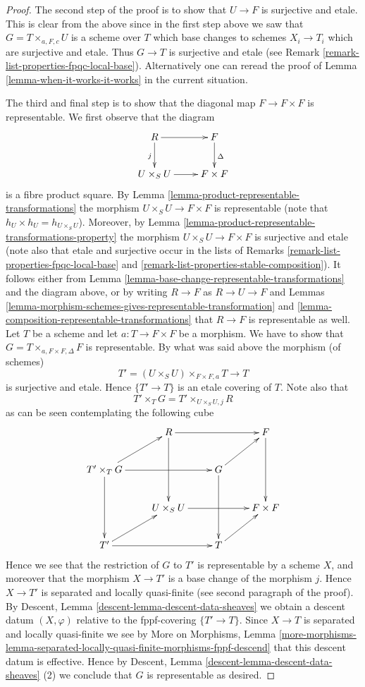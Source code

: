 \begin{proof}
\medskip\noindent
The second step of the proof is to show that $U \to F$ is surjective and
etale. This is clear from the above since in the first step above we
saw that $G = T \times_{a, F, c} U$ is a scheme over $T$ which base changes
to schemes $X_i \to T_i$ which are surjective and etale. Thus $G \to T$
is surjective and etale (see
Remark \ref{remark-list-properties-fpqc-local-base}).
Alternatively one can reread the proof of
Lemma \ref{lemma-when-it-works-it-works} in the current
situation.

\medskip\noindent
The third and final step is to show that the diagonal map $F \to F \times F$
is representable. We first observe that the diagram
$$
\xymatrix{
R \ar[r] \ar[d]_j & F \ar[d]^\Delta \\
U \times_S U \ar[r] & F \times F
}
$$
is a fibre product square. By
Lemma \ref{lemma-product-representable-transformations} the morphism
$U \times_S U \to F \times F$ is representable (note that
$h_U \times h_U = h_{U \times_S U}$). Moreover, by
Lemma \ref{lemma-product-representable-transformations-property}
the morphism $U \times_S U \to F \times F$ is surjective
and etale (note also that etale and surjective occur in the lists of
Remarks \ref{remark-list-properties-fpqc-local-base}
and \ref{remark-list-properties-stable-composition}).
It follows either from
Lemma \ref{lemma-base-change-representable-transformations}
and the diagram above, or by writing $R \to F$ as $R \to U \to F$ and
Lemmas
\ref{lemma-morphism-schemes-gives-representable-transformation} and
\ref{lemma-composition-representable-transformations} that
$R \to F$ is representable as well. Let $T$ be a scheme and let
$a : T \to F \times F$ be a morphism. We have to show that
$G = T \times_{a, F \times F, \Delta} F$ is representable.
By what was said above the morphism (of schemes)
$$
T' = (U \times_S U) \times_{F \times F, a} T \longrightarrow T
$$
is surjective and etale. Hence $\{T' \to T\}$ is an etale
covering of $T$. Note also that
$$
T' \times_T G = T' \times_{U \times_S U, j} R
$$
as can be seen contemplating the following cube
$$
\xymatrix{
& R \ar[rr] \ar[dd] & & F \ar[dd] \\
T' \times_T G \ar[rr] \ar[dd] \ar[ru] & & G \ar[dd] \ar[ru] & \\
& U \times_S U \ar[rr] & & F \times F \\
T' \ar[rr] \ar[ru] & & T \ar[ru]
}
$$
Hence we see that the restriction of $G$ to $T'$ is representable
by a scheme $X$, and moreover that the morphism $X \to T'$ is
a base change of the morphism $j$. Hence $X \to T'$ is
separated and locally quasi-finite (see second paragraph of the proof).
By Descent, Lemma \ref{descent-lemma-descent-data-sheaves}
we obtain a descent datum $(X, \varphi)$ relative
to the fppf-covering $\{T' \to T\}$. Since
$X \to T$ is separated and locally quasi-finite we see by
More on Morphisms, Lemma
\ref{more-morphisms-lemma-separated-locally-quasi-finite-morphisms-fppf-descend}
that this descent datum is effective.
Hence by
Descent, Lemma \ref{descent-lemma-descent-data-sheaves} (2)
we conclude that $G$ is representable as desired.
\end{proof}


